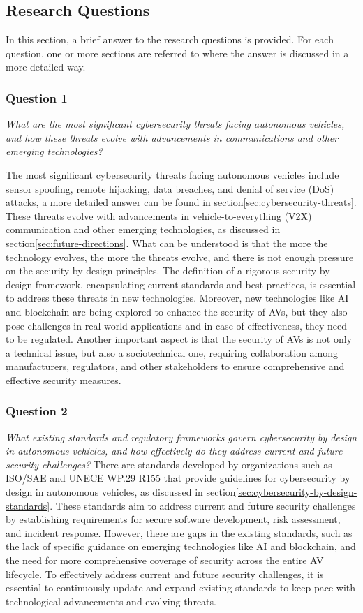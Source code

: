 \subsection{Research Questions}\label{subsec:research-questions}
In this section, a brief answer to the research questions is provided.
For each question, one or more sections are referred to where the answer is discussed in a more detailed way.

\subsubsection{Question 1}
\textit{What are the most significant cybersecurity threats facing autonomous vehicles, and how these threats evolve with advancements in communications and other emerging technologies?}

The most significant cybersecurity threats facing autonomous vehicles include sensor spoofing, remote hijacking, data breaches, and denial of service (DoS) attacks,
a more detailed answer can be found in section\ref{sec:cybersecurity-threats}.
These threats evolve with advancements in vehicle-to-everything (V2X) communication and other emerging technologies, as discussed in section\ref{sec:future-directions}.
What can be understood is that the more the technology evolves, the more the threats evolve, and there is not enough pressure on the security by design principles.
The definition of a rigorous security-by-design framework, encapsulating current standards and best practices, is essential to address these threats in new technologies.
Moreover, new technologies like AI and blockchain are being explored to enhance the security of AVs, but they also pose challenges in real-world applications and in case of effectiveness, they need to be regulated.
Another important aspect is that the security of AVs is not only a technical issue, but also a sociotechnical one, requiring collaboration among manufacturers, regulators, and other stakeholders to ensure comprehensive and effective security measures.

\subsubsection{Question 2}
\textit{What existing standards and regulatory frameworks govern cybersecurity by design in autonomous vehicles, and how effectively do they address current and future security challenges?}
There are standards developed by organizations such as ISO/SAE and UNECE WP.29 R155 that provide guidelines for cybersecurity by design in autonomous vehicles, as discussed in section\ref{sec:cybersecurity-by-design-standards}.
These standards aim to address current and future security challenges by establishing requirements for secure software development, risk assessment, and incident response.
However, there are gaps in the existing standards, such as the lack of specific guidance on emerging technologies like AI and blockchain, and the need for more comprehensive coverage of security across the entire AV lifecycle.
To effectively address current and future security challenges, it is essential to continuously update and expand existing standards to keep pace with technological advancements and evolving threats.

